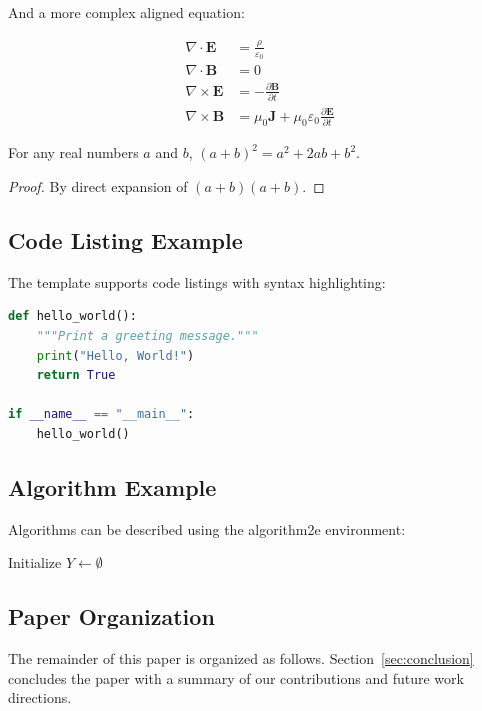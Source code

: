 And a more complex aligned equation:

\begin{align}
    \nabla \cdot \mathbf{E} &= \frac{\rho}{\varepsilon_0} \\
    \nabla \cdot \mathbf{B} &= 0 \\
    \nabla \times \mathbf{E} &= -\frac{\partial \mathbf{B}}{\partial t} \\
    \nabla \times \mathbf{B} &= \mu_0 \mathbf{J} + \mu_0 \varepsilon_0 \frac{\partial \mathbf{E}}{\partial t}
\end{align}

\begin{theorem}
\label{thm:example}
For any real numbers $a$ and $b$, $(a + b)^2 = a^2 + 2ab + b^2$.
\end{theorem}

\begin{proof}
By direct expansion of $(a + b)(a + b)$.
\end{proof}

\subsection{Code Listing Example}

The template supports code listings with syntax highlighting:

\begin{lstlisting}[language=Python, caption={Example Python code}]
def hello_world():
    """Print a greeting message."""
    print("Hello, World!")
    return True

if __name__ == "__main__":
    hello_world()
\end{lstlisting}

\subsection{Algorithm Example}

Algorithms can be described using the algorithm2e environment:

\begin{algorithm}[t]
\caption{Example Algorithm}
\label{alg:example}
Initialize $Y \leftarrow \emptyset$\;
\end{algorithm}

\subsection{Paper Organization}

The remainder of this paper is organized as follows.
Section~\ref{sec:conclusion} concludes the paper with a summary
of our contributions and future work directions.
